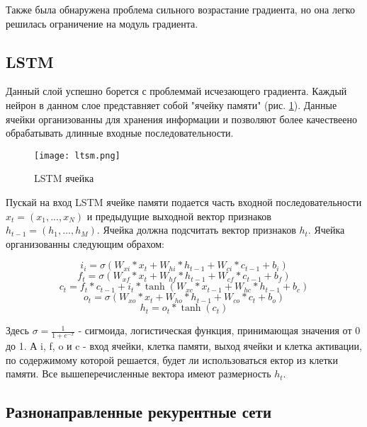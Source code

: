 Также была обнаружена проблема сильного возрастание градиента, но она легко решилась ограничение на модуль градиента.

\subsection{LSTM}

Данный слой успешно борется с проблеммай исчезающего градиента. Каждый нейрон в данном слое представняет собой "ячейку памяти" (рис. \ref{ris:ltsm}). Данные ячейки организованны для хранения информации и позволяют более качествеено обрабатывать длинные входные последовательности.

\begin{figure}[h]
\begin{center}
	\texttt{[image: ltsm.png]}
	\caption{LSTM ячейка}
	\label{ris:ltsm}
\end{center}
\end{figure}


Пускай на вход LSTM ячейке памяти подается часть входной последовательности $x_t = (x_1, ..., x_N)$ и предыдущие выходной вектор признаков $h_{t-1} = (h_1, ..., h_M)$. Ячейка должна подсчитать вектор признаков $h_t$. Ячейка организованны следующим обрахом:


\begin{equation}
	i_i = \sigma(W_{xi}*x_t+W_{hi}*h_{t-1}+W_{ci}*c_{t-1}+b_i)
\end{equation}
\begin{equation}
	f_t = \sigma(W_{xf}*x_t+W_{hf}*h_{t-1}+W_{cf}*c_{t-1}+b_f)
\end{equation}
\begin{equation}
	c_t = f_t*c_{t-1}+i_t*\tanh(W_{xc}*x_{t-1}+W_{hc}*h_{t-1}+b_c)
\end{equation}
\begin{equation}
	o_t = \sigma(W_{xo}*x_t+W_{ho}*h_{t-1}+W_{co}*c_t+b_o)
\end{equation}
\begin{equation}
	h_t = o_t*\tanh(c_t)
\end{equation}

Здесь $\sigma = \frac{1}{1+e^{-x}} $ - сигмоида, логистическая функция, принимающая значения от 0 до 1. А i, f, o и c - вход ячейки, клетка памяти, выход ячейки и клетка активации, по содержимому которой решается, будет ли использоваться ектор из клетки памяти. Все вышеперечисленные вектора имеют размерность $h_t$.

\subsection{Разнонаправленные рекурентные сети}